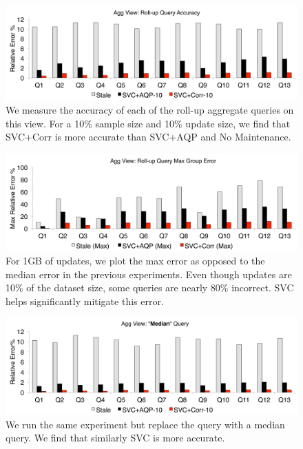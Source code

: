 \begin{figure}[t]
\centering
 \includegraphics[scale=0.17]{exp/msdc_3.pdf}
   \caption{We measure the accuracy of each of the roll-up aggregate queries on this view. For a 10\% sample size and 10\% update size, we find that SVC+Corr is more accurate than SVC+AQP and No Maintenance.\label{exp2-acc-sample2}}
\end{figure}



\begin{figure}[t]
\centering
\includegraphics[scale=0.17]{exp/msdc_4.pdf}
   \caption{For 1GB of updates, we plot the max error as opposed to the median error in the previous experiments. Even though updates are 10\% of the dataset size, some queries are nearly 80\% incorrect. SVC helps significantly mitigate this error. \label{exp2-max}}
\end{figure}

\begin{figure}[t]
\centering
  \includegraphics[scale=0.17]{exp/msdc_5.pdf}
 \caption{We run the same experiment but replace the \sumfunc query with a median query. We find that similarly SVC is more accurate.\label{exp2-median} }
\end{figure}


